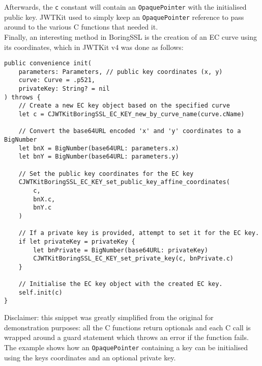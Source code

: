 Afterwards, the \lstinline{c} constant will contain an \lstinline{OpaquePointer} with the initialised public key. JWTKit used to simply keep an \lstinline{OpaquePointer} reference to pass around to the various C functions that needed it. \\
Finally, an interesting method in BoringSSL is the creation of an EC curve using its coordinates, which in JWTKit v4 was done as follows:
\begin{verbatim}
public convenience init(
    parameters: Parameters, // public key coordinates (x, y)
    curve: Curve = .p521,
    privateKey: String? = nil
) throws {
    // Create a new EC key object based on the specified curve
    let c = CJWTKitBoringSSL_EC_KEY_new_by_curve_name(curve.cName) 

    // Convert the base64URL encoded 'x' and 'y' coordinates to a BigNumber
    let bnX = BigNumber(base64URL: parameters.x)
    let bnY = BigNumber(base64URL: parameters.y)

    // Set the public key coordinates for the EC key
    CJWTKitBoringSSL_EC_KEY_set_public_key_affine_coordinates(
        c, 
        bnX.c, 
        bnY.c
    )

    // If a private key is provided, attempt to set it for the EC key.
    if let privateKey = privateKey {
        let bnPrivate = BigNumber(base64URL: privateKey)
        CJWTKitBoringSSL_EC_KEY_set_private_key(c, bnPrivate.c)
    }

    // Initialise the EC key object with the created EC key.
    self.init(c)
}
\end{verbatim}
Disclaimer: this snippet was greatly simplified from the original for demonstration purposes: all the C functions return optionals and each C call is wrapped around a guard statement which throws an error if the function fails. \\
The example shows how an \lstinline{OpaquePointer} containing a key can be initialised using the keys coordinates and an optional private key. \cite{jwtkit-4}

